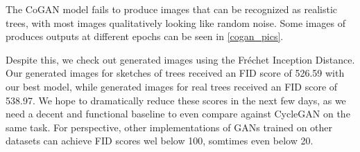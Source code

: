 \documentclass[10pt,twocolumn,letterpaper]{article}
\begin{document}
The CoGAN model fails to produce images that can be recognized as realistic trees, with most images qualitatively looking like random noise.
Some images of produces outputs at different epochs can be seen in \ref{cogan_pics}.

Despite this, we check out generated images using the Fr\'echet Inception Distance.
Our generated images for sketches of trees received an FID score of 526.59 with our best model, while generated images for real trees received an FID score of 538.97.
We hope to dramatically reduce these scores in the next few days, as we need a decent and functional baseline to even compare against CycleGAN on the same task.
For perspective, other implementations of GANs trained on other datasets can achieve FID scores wel below 100, somtimes even below 20.
{\small


}
\end{document}
